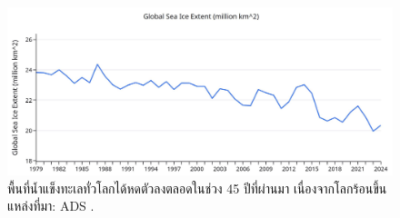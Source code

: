 \documentclass[10pt,twocolumn,letterpaper]{article}
\begin{document}
\begin{figure}[t]
\begin{center}
\includegraphics[width=1\textwidth]{ice.jpg}
\end{center}
   \caption{พื้นที่น้ำแข็งทะเลทั่วโลกได้หดตัวลงตลอดในช่วง 45 ปีที่ผ่านมา เนื่องจากโลกร้อนขึ้น แหล่งที่มา: ADS \cite{149}.}
\label{fig:24}
\end{figure}

\clearpage
\twocolumn

{\small


}
\end{document}
